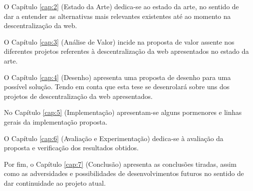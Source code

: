 O Capítulo \ref{cap:2} (Estado da Arte) dedica-se ao estado da arte, no sentido de dar a entender as alternativas mais relevantes existentes até ao momento na descentralização da web.

O Capítulo \ref{cap:3} (Análise de Valor) incide na proposta de valor assente nos diferentes projetos referentes à descentralização da web apresentados no estado da arte.

O Capítulo \ref{cap:4} (Desenho) apresenta uma proposta de desenho para uma possível solução. Tendo em conta que esta tese se desenrolará sobre uns dos projetos de descentralização da web apresentados.

No Capítulo \ref{cap:5} (Implementação) apresentam-se alguns pormenores e linhas gerais da implementação proposta.

O Capítulo \ref{cap:6} (Avaliação e Experimentação) dedica-se à avaliação da proposta e verificação dos resultados obtidos.

Por fim, o Capítulo \ref{cap:7} (Conclusão) apresenta as conclusões tiradas, assim como as adversidades e possibilidades de desenvolvimentos futuros no sentido de dar continuidade ao projeto atual.